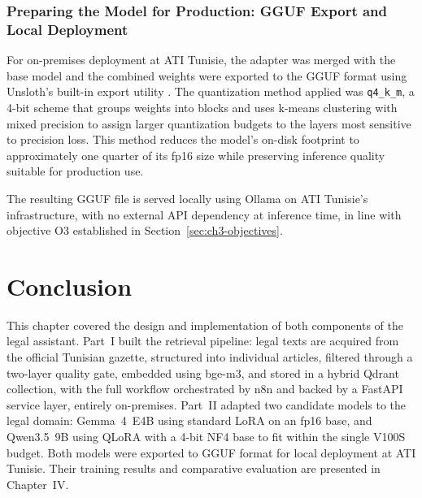 \subsubsection{Preparing the Model for Production: GGUF Export and Local Deployment}

For on-premises deployment at \ac{ATI} Tunisie, the adapter was merged with the base model and the combined weights were exported to the \ac{GGUF} format using Unsloth's built-in export utility \cite{unsloth2024}. The quantization method applied was \texttt{q4\_k\_m}, a 4-bit scheme that groups weights into blocks and uses k-means clustering with mixed precision to assign larger quantization budgets to the layers most sensitive to precision loss. This method reduces the model's on-disk footprint to approximately one quarter of its fp16 size while preserving inference quality suitable for production use.

\vspace{1em}

The resulting \ac{GGUF} file is served locally using Ollama on \ac{ATI} Tunisie's infrastructure, with no external \ac{API} dependency at inference time, in line with objective O3 established in Section~\ref{sec:ch3-objectives}.

\section{Conclusion}

This chapter covered the design and implementation of both components of the legal assistant. Part~I built the retrieval pipeline: legal texts are acquired from the official Tunisian gazette, structured into individual articles, filtered through a two-layer quality gate, embedded using bge-m3, and stored in a hybrid Qdrant collection, with the full workflow orchestrated by n8n and backed by a FastAPI service layer, entirely on-premises. Part~II adapted two candidate models to the legal domain: Gemma~4~E4B using standard \ac{LoRA} on an fp16 base, and Qwen3.5~9B using \ac{QLoRA} with a 4-bit NF4 base to fit within the single V100S budget. Both models were exported to \ac{GGUF} format for local deployment at \ac{ATI} Tunisie. Their training results and comparative evaluation are presented in Chapter~IV.
